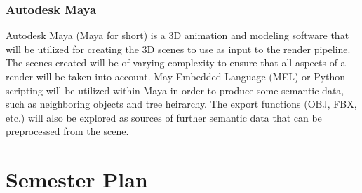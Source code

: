 \documentclass[conference]{IEEEtran}
\begin{document}
\subsubsection{Autodesk Maya}
Autodesk Maya (Maya for short) is a 3D animation and modeling software that will be utilized
for creating the 3D scenes to use as input to the render pipeline.
The scenes created will be of varying complexity to ensure that all aspects of a
render will be taken into account. May Embedded Language (MEL) or Python scripting
will be utilized within Maya in order to produce some semantic data, such as neighboring
objects and tree heirarchy. The export functions (OBJ, FBX, etc.) will also be explored
as sources of further semantic data that can be preprocessed from the scene.

\section{Semester Plan}
\label{subsec:semester_plan}
\end{document}
